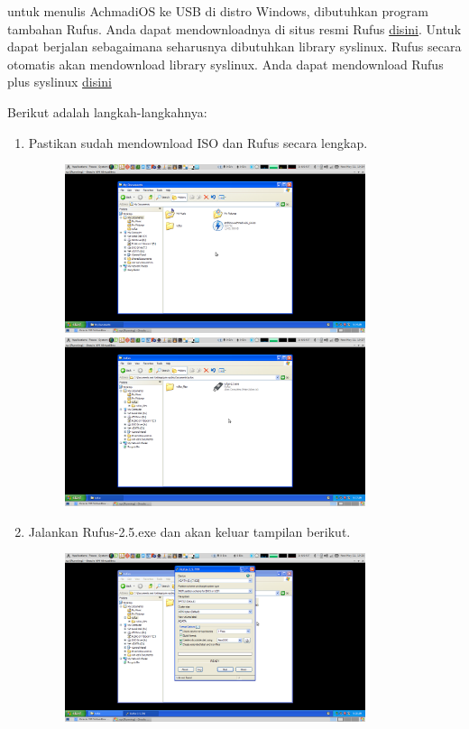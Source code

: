 \documentclass[12pt,]{article}
\begin{document}
	untuk menulis AchmadiOS ke USB di distro Windows, dibutuhkan program tambahan Rufus.
	Anda dapat mendownloadnya di situs resmi Rufus \href{https://rufus.akeo.ie/}{disini}.
	Untuk dapat berjalan sebagaimana seharusnya dibutuhkan library syslinux.
	Rufus secara otomatis akan mendownload library syslinux.
	Anda dapat mendownload Rufus plus syslinux \href{http://www.mediafire.com/download/5gdb8z98zg8sgxj/rufus.zip}{disini} 
	
	Berikut adalah langkah-langkahnya:
	\begin{enumerate}
		\item Pastikan sudah mendownload ISO dan Rufus secara lengkap.
		\begin{figure}[h]
			\centering
			\includegraphics[width=250pt]{usbwin/step_1}
			\includegraphics[width=250pt]{usbwin/step_2}
		\end{figure}
	
		\item Jalankan Rufus-2.5.exe dan akan keluar tampilan berikut.
		\begin{figure}[h]
			\centering
			\includegraphics[width=250pt]{usbwin/step_3}
		\end{figure}
	

\end{enumerate}
\end{document}
